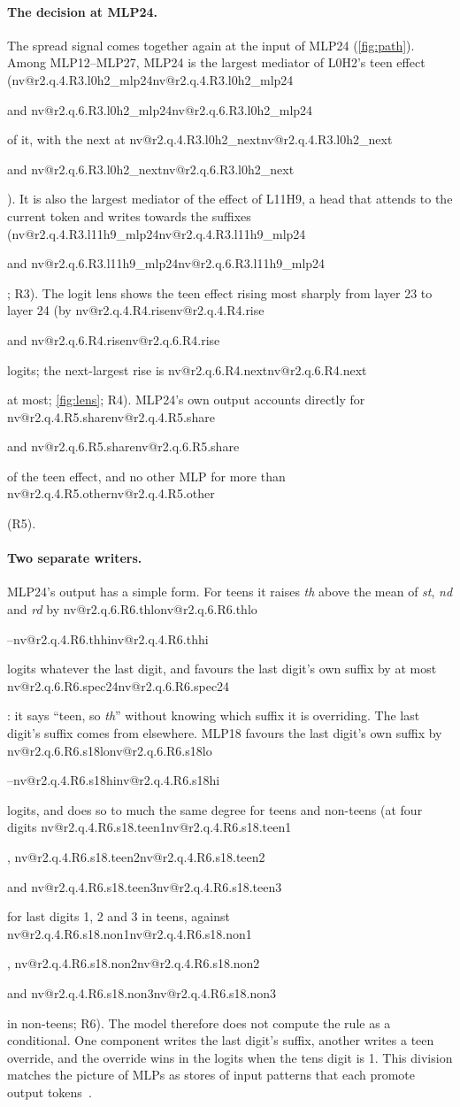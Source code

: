 \documentclass[11pt]{article}
\makeatletter
\newcommand{\nv}[1]{\ifcsname nv@#1\endcsname\csname nv@#1\endcsname\else\PackageError{numbers}{Unknown number key #1}{}\fi}
\newcommand{\mlp}[1]{MLP#1}
\newcommand{\hd}[2]{L#1H#2}
\newcommand{\sfx}[1]{\textit{#1}}
\makeatother
\begin{document}
\paragraph{The decision at \mlp{24}.} The spread signal comes together again at the input of \mlp{24} (\cref{fig:path}). Among \mlp{12}--\mlp{27}, \mlp{24} is the largest mediator of \hd{0}{2}'s teen effect (\nv{r2.q.4.R3.l0h2_mlp24} and \nv{r2.q.6.R3.l0h2_mlp24} of it, with the next at \nv{r2.q.4.R3.l0h2_next} and \nv{r2.q.6.R3.l0h2_next}). It is also the largest mediator of the effect of \hd{11}{9}, a head that attends to the current token and writes towards the suffixes (\nv{r2.q.4.R3.l11h9_mlp24} and \nv{r2.q.6.R3.l11h9_mlp24}; R3). The logit lens shows the teen effect rising most sharply from layer 23 to layer 24 (by \nv{r2.q.4.R4.rise} and \nv{r2.q.6.R4.rise} logits; the next-largest rise is \nv{r2.q.6.R4.next} at most; \cref{fig:lens}; R4). \mlp{24}'s own output accounts directly for \nv{r2.q.4.R5.share} and \nv{r2.q.6.R5.share} of the teen effect, and no other MLP for more than \nv{r2.q.4.R5.other} (R5).

\paragraph{Two separate writers.} \mlp{24}'s output has a simple form. For teens it raises \sfx{th} above the mean of \sfx{st}, \sfx{nd} and \sfx{rd} by \nv{r2.q.6.R6.thlo}--\nv{r2.q.4.R6.thhi} logits whatever the last digit, and favours the last digit's own suffix by at most \nv{r2.q.6.R6.spec24}: it says ``teen, so \sfx{th}'' without knowing which suffix it is overriding. The last digit's suffix comes from elsewhere. \mlp{18} favours the last digit's own suffix by \nv{r2.q.6.R6.s18lo}--\nv{r2.q.4.R6.s18hi} logits, and does so to much the same degree for teens and non-teens (at four digits \nv{r2.q.4.R6.s18.teen1}, \nv{r2.q.4.R6.s18.teen2} and \nv{r2.q.4.R6.s18.teen3} for last digits 1, 2 and 3 in teens, against \nv{r2.q.4.R6.s18.non1}, \nv{r2.q.4.R6.s18.non2} and \nv{r2.q.4.R6.s18.non3} in non-teens; R6). The model therefore does not compute the rule as a conditional. One component writes the last digit's suffix, another writes a teen override, and the override wins in the logits when the tens digit is 1. This division matches the picture of MLPs as stores of input patterns that each promote output tokens~\citep{geva2021kv}.
\end{document}
